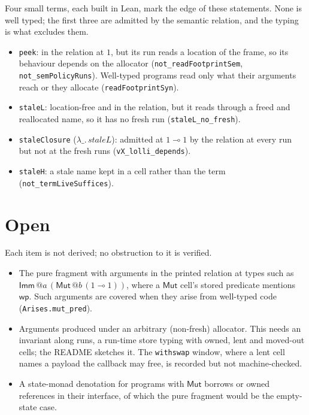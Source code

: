 \documentclass[10pt]{article}
\newcommand{\lean}[1]{\texttt{#1}}
\renewcommand{\wp}{\mathsf{wp}}
\begin{document}
Four small terms, each built in Lean, mark the edge of these statements. None is well typed;
the first three are admitted by the semantic relation, and the typing is what excludes them.
\begin{itemize}
\item \lean{peek}: in the relation at $1$, but its run reads a location of the frame, so its
  behaviour depends on the allocator (\lean{not\_readFootprintSem},
  \lean{not\_semPolicyRuns}). Well-typed programs read only what their arguments reach or they
  allocate (\lean{readFootprintSyn}).
\item \lean{staleL}: location-free and in the relation, but it reads through a freed and
  reallocated name, so it has no fresh run (\lean{staleL\_no\_fresh}).
\item \lean{staleClosure} ($\lambda\_.\,\mathit{staleL}$): admitted at $1 \multimap 1$ by the
  relation at every run but not at the fresh runs (\lean{vX\_lolli\_depends}).
\item \lean{staleH}: a stale name kept in a cell rather than the term
  (\lean{not\_termLiveSuffices}).
\end{itemize}

\section{Open}

Each item is not derived; no obstruction to it is verified.
\begin{itemize}
\item The pure fragment with arguments in the printed relation at types such as
  $\mathsf{Imm}\,@a\,(\mathsf{Mut}\,@b\,(1 \multimap 1))$, where a $\mathsf{Mut}$ cell's stored
  predicate mentions $\wp$. Such arguments are covered when they arise from well-typed code
  (\lean{Arises.mut\_pred}).
\item Arguments produced under an arbitrary (non-fresh) allocator. This needs an invariant along
  runs, a run-time store typing with owned, lent and moved-out cells; the README sketches it.
  The \lean{withswap} window, where a lent cell names a payload the callback may free, is
  recorded but not machine-checked.
\item A state-monad denotation for programs with $\mathsf{Mut}$ borrows or owned references in
  their interface, of which the pure fragment would be the empty-state case.
\end{itemize}
\end{document}
